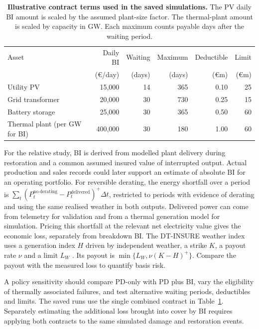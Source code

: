 \documentclass[11pt,a4paper]{article}
\begin{document}
\begin{table}[htbp]
\centering
\small
\caption{\textbf{Illustrative contract terms used in the saved simulations.}
The PV daily BI amount is scaled by the assumed plant-size factor. The thermal-plant amount is scaled by capacity in GW. Each maximum counts payable days after the waiting period.}
\label{tab:terms}
\begin{tabularx}{\linewidth}{@{}Xrrrrr@{}}
\toprule
Asset & Daily BI & Waiting & Maximum & Deductible & Limit\\
 & (€/day) & (days) & (days) & (€m) & (€m)\\
\midrule
Utility PV & 15,000 & 14 & 365 & 0.10 & 25\\
Grid transformer & 20,000 & 30 & 730 & 0.25 & 15\\
Battery storage & 25,000 & 30 & 365 & 0.50 & 60\\
Thermal plant (per GW for BI) & 400,000 & 30 & 180 & 1.00 & 60\\
\bottomrule
\end{tabularx}
\end{table}

For the relative study, BI is derived from modelled plant delivery during restoration and a common assumed insured value of interrupted output. Actual production and sales records could later support an estimate of absolute BI for an operating portfolio. For reversible derating, the energy shortfall over a period is \(\sum_t(P_t^{\mathrm{no\ derating}}-P_t^{\mathrm{delivered}})^+\Delta t\), restricted to periods with evidence of derating and using the same realised weather in both outputs. Delivered power can come from telemetry for validation and from a thermal generation model for simulation. Pricing this shortfall at the relevant net electricity value gives the economic loss, separately from breakdown BI. The DT-INSURE weather index uses a generation index \(H\) driven by independent weather, a strike \(K\), a payout rate \(\nu\) and a limit \(L_W\) \cite{dtinsure}. Its payout is \(\min\{L_W,\nu(K-H)^+\}\). Compare the payout with the measured loss to quantify basis risk.

A policy sensitivity should compare PD-only with PD plus BI, vary the eligibility of thermally associated failures, and test alternative waiting periods, deductibles and limits. The saved runs use the single combined contract in Table~\ref{tab:terms}. Separately estimating the additional loss brought into cover by BI requires applying both contracts to the same simulated damage and restoration events.
\end{document}
